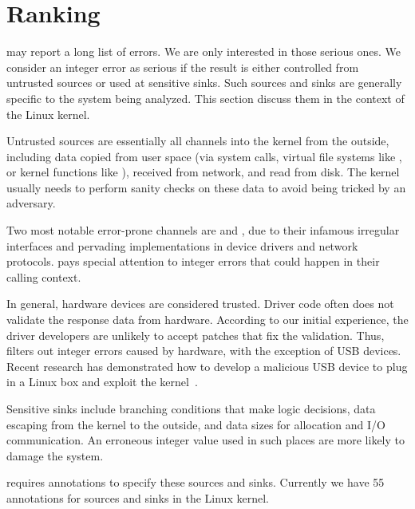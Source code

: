 \section{Ranking}
\label{s:rank}

\sys may report a long list of errors.  We are only interested in
those serious ones.  We consider an integer error as serious if the
result is either controlled from untrusted sources or used at
sensitive sinks.  Such sources and sinks are generally specific to
the system being analyzed.  This section discuss them in the context
of the Linux kernel.

Untrusted sources are essentially all channels into the kernel from
the outside, including data copied from user space (via system
calls, virtual file systems like , or kernel functions
like ), received from network, and read from
disk.
The kernel usually needs to perform sanity checks on these data to
avoid being tricked by an adversary.

Two most notable error-prone channels are  and ,
due to their infamous irregular interfaces and pervading implementations
in device drivers and network protocols.  \sys pays special attention
to integer errors that could happen in their calling context.

In general, hardware devices are considered trusted.  Driver code
often does not validate the response data from hardware.  According
to our initial experience, the driver developers are unlikely to
accept patches that fix the validation.  Thus, \sys filters out
integer errors caused by hardware,
%
with the exception of USB devices.  Recent research has demonstrated
how to develop a malicious USB device to plug in a Linux box and
exploit the kernel~\cite{usb:buffer-overflow}.

Sensitive sinks include branching conditions that make logic
decisions, data escaping from the kernel to the outside, and data
sizes for allocation and I/O communication.  An erroneous integer
value used in such places are more likely to damage the system.

\sys requires annotations to specify these sources and sinks.
Currently we have 55 annotations for sources and sinks in the Linux kernel.
